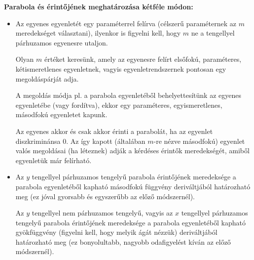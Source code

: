 \documentclass[12pt,a4paper]{article}
\begin{document}
\textbf{Parabola és érintőjének meghatározása kétféle módon:}
\begin{itemize}
\item Az egyenes egyenletét egy paraméterrel felírva (célszerű paraméternek az $m$ meredekséget választani), ilyenkor is figyelni kell, hogy $m$ ne a tengellyel párhuzamos egyenesre utaljon.

Olyan $m$ értéket keresünk, amely az egyenesre felírt elsőfokú, paraméteres, kétismeretlenes egyenletnek, vagyis egyenletrendszernek pontosan egy megoldáspárját adja.

A megoldás módja pl. a parabola egyenletéből behelyettesítünk az egyenes egyenletébe (vagy fordítva), ekkor egy paraméteres, egyismeretlenes, másodfokú egyenletet kapunk.

Az egyenes akkor és csak akkor érinti a parabolát, ha az egyenlet diszkriminánsa 0. Az így kapott (általában $m$-re nézve másodfokú) egyenlet valós megoldásai (ha léteznek) adják a kérdéses érintők meredekségét, amiből egyenletük már felírható.
\item Az $y$ tengellyel párhuzamos tengelyű parabola érintőjének meredeksége a parabola egyenletéből kapható másodfokú függvény deriváltjából határozható meg (ez jóval gyorsabb és egyszerűbb az előző módszernél).

Az $y$ tengellyel nem párhuzamos tengelyű, vagyis az $x$ tengellyel párhuzamos tengelyű parabola érintőjének meredeksége a parabola egyenletéből kapható gyökfüggvény (figyelni kell, hogy melyik ágát nézzük) deriváltjából határozható meg (ez bonyolultabb, nagyobb odafigyelést kíván az előző módszernél).
\end{itemize}
\end{document}
